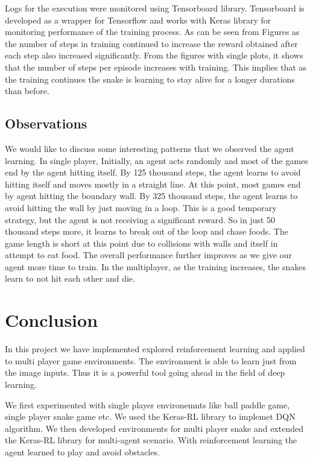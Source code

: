 \documentclass[conference,10pt]{IEEEtran}
\begin{document}
	Logs for the execution were monitored using Tensorboard library. Tensorboard is developed as a wrapper for Tensorflow and works with Keras library for monitoring performance of the training process.
	\break
	\break
	As can be seen from Figures as the number of steps in training continued to increase the reward obtained after each step also increased significantly.
	\break
	\break
	From the figures with single plots, it shows that the number of steps per episode increases with training. This implies that as the training continues the snake is learning to stay alive for a longer durations than before.

	\subsection{Observations}
	We would like to discuss some interesting patterns that we observed the agent learning. In single player, Initially, an agent acts randomly and most of the games end by the agent hitting itself. By 125 thousand steps, the agent learns to avoid hitting itself and moves mostly in a straight line. At this point, most games end by agent hitting the boundary wall. By 325 thousand steps,  the agent learns to avoid hitting the wall by just moving in a loop. This is a good temporary strategy, but the agent is not receiving a significant reward. So in just 50 thousand steps more, it learns to break out of the loop and chase foods. The game length is short at this point due to collisions with walls and itself in attempt to eat food. The overall performance further improves as we give our agent more time to train.
	\break
	\break
	In the multiplayer, as the training increases, the snakes learn to not hit each other and die.

\section{Conclusion}
In this project we have implemented explored reinforcement learning and applied to multi player game environments. The environment is able to learn just from the image inputs. Thus it is a powerful tool going ahead in the field of deep learning.

We first experimented with single player environemnts like ball paddle game, single player snake game etc. We used the Keras-RL library to implemet DQN algorithm. We then developed environments for multi player snake and extended the Keras-RL library for multi-agent scenario. With reinforcement learning the agent learned to play and avoid obstacles.
\end{document}
